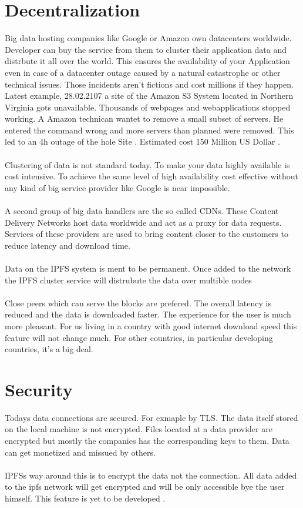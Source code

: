 \documentclass[a4paper,11pt, oneside]{report}
\theoremstyle{definition}
\begin{document}
\section{Decentralization}
Big data hosting companies like Google or Amazon own datacenters worldwide. Developer can buy the service from them to cluster their application data  and distrbute it all over the world. This ensures the availability of your Application even in case of a datacenter outage caused by a natural catastrophe or other technical issues. Those incidents aren't fictions and cost millions if they happen. Latest example, 28.02.2107 a site of the Amazon S3 System located in Northern Virginia gots unavailable. Thousands of webpages and webapplications stopped working. A Amazon technican wantet to remove a small subset of servers. He entered the command wrong and more servers than planned were removed. This led to an 4h outage of the hole Site \cite{AWSOutage}. Estimated cost 150 Million US Dollar \cite{AWSOutageCost}.\\\\
Clustering of data is not standard today. To make your data highly available is cost intensive. To achieve the same level of high availability cost effective without any kind of big service provider like Google is near impossible.\\\\
A second group of big data handlers are the so called CDNs. These Content Delivery Networks host data worldwide and act as a proxy for data requests. Services of these providers are used to bring content closer to the customers to reduce latency and download time.\\ \\
Data on the IPFS system is ment to be permanent.  Once added to the network the IPFS cluster service will distrubute the data over multible nodes\\ \\
Close peers which can serve the blocks are prefered. The overall latency is reduced and the data is downloaded faster. The experience for the user is much more pleasant. For us living in a country with good internet download speed this feature will not change much. For other countries, in particular developing countries, it's a big deal.

\section{Security}
Todays data connections are secured. For exmaple by TLS. The data itself stored on the local machine is not encrypted. Files located at a data provider are encrypted but mostly the companies has the corresponding keys to them. Data can get monetized and missued by others.\\ \\ 
IPFSs way around this is to encrypt the data not the connection. All data added to the ipfs network will get encrypted and will be only accessible bye the user himself. This feature is yet to be developed \cite{Encryption}.
\end{document}
